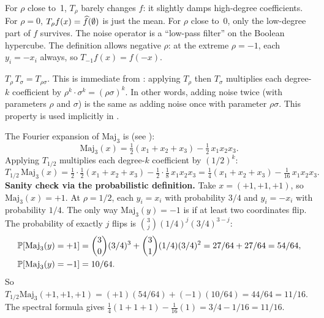 \begin{remark}[Interpretation]\label{rem:noise-interpretation}
For $\rho$ close to~1, $T_\rho$ barely changes $f$: it slightly damps
high-degree coefficients. For $\rho = 0$, $T_\rho f(x) = \widehat{f}(\emptyset)$
is just the mean. For $\rho$ close to~0, only the low-degree part of $f$
survives. The noise operator is a ``low-pass filter'' on the Boolean
hypercube. The definition allows negative $\rho$: at the extreme
$\rho = -1$, each $y_i = -x_i$ always, so $T_{-1} f(x) = f(-x)$.
\end{remark}

\begin{remark}\label{rem:semigroup}
$T_\rho \, T_\sigma = T_{\rho\sigma}$. This is immediate from
: applying $T_\rho$ then $T_\sigma$ multiplies
each degree-$k$ coefficient by $\rho^k \cdot \sigma^k = (\rho\sigma)^k$.
In other words, adding noise twice (with parameters $\rho$ and $\sigma$)
is the same as adding noise once with parameter $\rho\sigma$. This
property is used implicitly in .
\end{remark}


\begin{example}%
\label{ex:noise-operator-maj3}
The Fourier expansion of $\text{Maj}_3$ is (see ):
\[
  \text{Maj}_3(x) = \tfrac{1}{2}(x_1 + x_2 + x_3)
  - \tfrac{1}{2}\,x_1 x_2 x_3.
\]
Applying $T_{1/2}$ multiplies each degree-$k$ coefficient by $(1/2)^k$:
\[
  T_{1/2}\,\text{Maj}_3(x)
  = \tfrac{1}{2}\cdot\tfrac{1}{2}(x_1 + x_2 + x_3)
  - \tfrac{1}{2}\cdot\tfrac{1}{8}\,x_1 x_2 x_3
  = \tfrac{1}{4}(x_1{+}x_2{+}x_3) - \tfrac{1}{16}\,x_1 x_2 x_3.
\]
\textbf{Sanity check via the probabilistic definition.}
Take $x = (+1,+1,+1)$, so $\text{Maj}_3(x) = +1$. At $\rho = 1/2$,
each $y_i = x_i$ with probability $3/4$ and $y_i = -x_i$ with
probability $1/4$. The only way $\text{Maj}_3(y) = -1$ is if at least
two coordinates flip. The probability of exactly $j$ flips is
$\binom{3}{j}(1/4)^j(3/4)^{3-j}$:
\begin{align*}
  \mathbb{P}[\text{Maj}_3(y) = +1] &= \binom{3}{0}(3/4)^3 + \binom{3}{1}(1/4)(3/4)^2
  = 27/64 + 27/64 = 54/64,\\
  \mathbb{P}[\text{Maj}_3(y) = -1] &= 10/64.
\end{align*}
So $T_{1/2}\text{Maj}_3(+1,+1,+1) = (+1)(54/64) + (-1)(10/64) = 44/64 = 11/16$.
The spectral formula gives
$\tfrac{1}{4}(1{+}1{+}1) - \tfrac{1}{16}(1) = 3/4 - 1/16 = 11/16$. \checkmark
\end{example}


